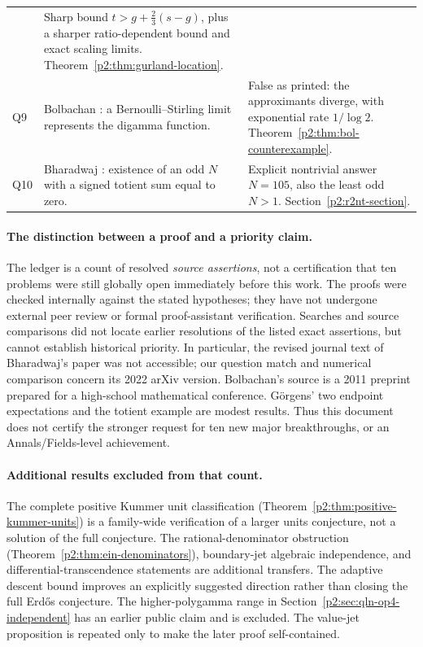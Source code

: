 \documentclass[11pt,a4paper]{article}
\theoremstyle{definition}
\theoremstyle{remark}
\numberwithin{equation}{section}
\begin{document}
\begin{longtable}{@{}p{}p{}p{}@{}}
& Sharp bound $t>g+\frac23(s-g)$, plus a sharper ratio-dependent bound
and exact scaling limits. Theorem~\ref{p2:thm:gurland-location}. \\
Q9 & Bolbachan \cite[Conjecture~1.4]{p2:Bolbachan2011}: a Bernoulli--Stirling
limit represents the digamma function.
& False as printed: the approximants diverge, with exponential rate
$1/\log2$. Theorem~\ref{p2:thm:bol-counterexample}. \\
Q10 & Bharadwaj \cite[Section~8, pp.~24--25]{p2:Bharadwaj2022}: existence of
an odd $N$ with a signed totient sum equal to zero.
& Explicit nontrivial answer $N=105$, also the least odd $N>1$.
Section~\ref{p2:r2nt-section}. \\
\bottomrule
\end{longtable}
\normalsize

\paragraph{The distinction between a proof and a priority claim.}
The ledger is a count of resolved \emph{source assertions}, not a
certification that ten problems were still globally open immediately
before this work. The proofs were checked internally against the stated
hypotheses; they have not undergone external peer review or formal
proof-assistant verification. Searches and source comparisons did not
locate earlier resolutions of the listed exact assertions, but cannot
establish historical priority. In particular, the revised journal text
of Bharadwaj's paper was not accessible; our question match and numerical
comparison concern its 2022 arXiv version. Bolbachan's source is a 2011
preprint prepared for a high-school mathematical conference. G\"orgens'
two endpoint expectations and the totient example are modest results.
Thus this document does not certify the stronger request for ten new
major breakthroughs, or an Annals/Fields-level achievement.

\paragraph{Additional results excluded from that count.}
The complete positive Kummer unit classification
(Theorem~\ref{p2:thm:positive-kummer-units}) is a family-wide verification
of a larger units conjecture, not a solution of the full conjecture.
The rational-denominator obstruction
(Theorem~\ref{p2:thm:ein-denominators}), boundary-jet algebraic
independence, and differential-transcendence statements are additional
transfers. The adaptive descent bound improves an explicitly suggested
direction rather than closing the full Erd\H{o}s conjecture.
The higher-polygamma range in Section~\ref{p2:sec:qln-op4-independent}
has an earlier public claim and is excluded. The value-jet proposition
is repeated only to make the later proof self-contained.
\end{document}
